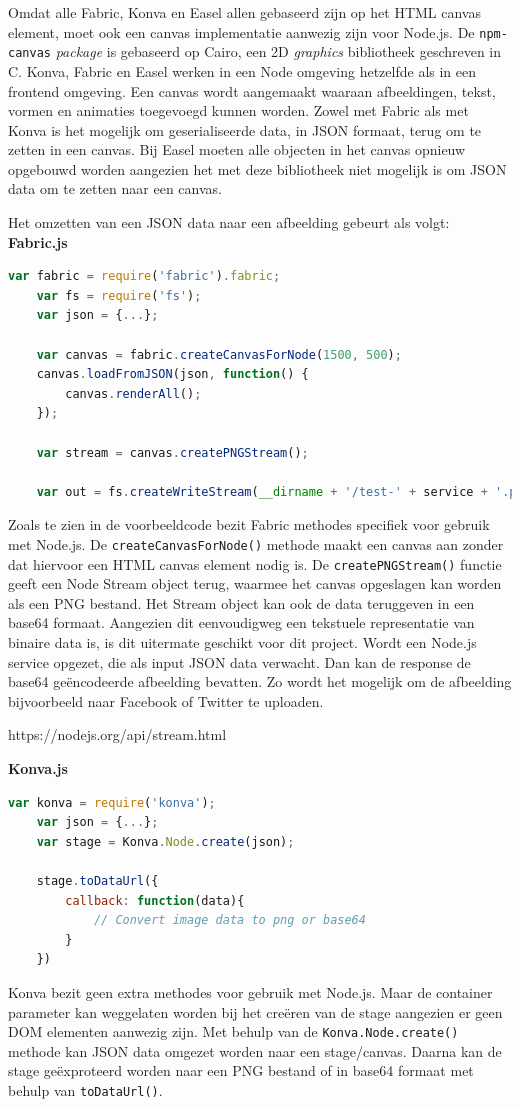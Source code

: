 Omdat alle Fabric, Konva en Easel allen gebaseerd zijn op het HTML canvas element, moet ook een canvas implementatie aanwezig zijn voor Node.js. De \lstinline{npm-canvas} \textit{package} is gebaseerd op Cairo, een 2D \textit{graphics} bibliotheek geschreven in C. %
Konva, Fabric en Easel werken in een Node omgeving hetzelfde als in een frontend omgeving. Een canvas wordt aangemaakt waaraan afbeeldingen, tekst, vormen en animaties toegevoegd kunnen worden. Zowel met Fabric als met Konva is het mogelijk om geserialiseerde data, in JSON formaat, terug om te zetten in een canvas. Bij Easel moeten alle objecten in het canvas opnieuw opgebouwd worden aangezien het met deze bibliotheek niet mogelijk is om JSON data om te zetten naar een canvas. 

Het omzetten van een JSON data naar een afbeelding gebeurt als volgt:
\textbf{Fabric.js}
\begin{lstlisting}[language=javascript]
	var fabric = require('fabric').fabric;
	var fs = require('fs');
	var json = {...};
	
	var canvas = fabric.createCanvasForNode(1500, 500);
	canvas.loadFromJSON(json, function() {
		canvas.renderAll();
	});
	
	var stream = canvas.createPNGStream();
	
	var out = fs.createWriteStream(__dirname + '/test-' + service + '.png');
\end{lstlisting}
Zoals te zien in de voorbeeldcode bezit Fabric methodes specifiek voor gebruik met Node.js. De \lstinline{createCanvasForNode()} methode maakt een canvas aan zonder dat hiervoor een HTML canvas element nodig is. De \lstinline{createPNGStream()} functie geeft een Node Stream object terug, waarmee het canvas opgeslagen kan worden als een PNG bestand. Het Stream object kan ook de data teruggeven in een base64 formaat. Aangezien dit eenvoudigweg een tekstuele representatie van binaire data is, is dit uitermate geschikt voor dit project. Wordt een Node.js service opgezet, die als input JSON data verwacht. Dan kan de response de base64 ge\"{e}ncodeerde afbeelding bevatten. Zo wordt het mogelijk om de afbeelding bijvoorbeeld naar Facebook of Twitter te uploaden. 

https://nodejs.org/api/stream.html

\textbf{Konva.js}
\begin{lstlisting}[language=javascript]
	var konva = require('konva');
	var json = {...};
	var stage = Konva.Node.create(json);
	
	stage.toDataUrl({
		callback: function(data){
			// Convert image data to png or base64 
		}
	})
\end{lstlisting} %
Konva bezit geen extra methodes voor gebruik met Node.js. Maar de container parameter kan weggelaten worden bij het cre\"{e}ren van de stage aangezien er geen DOM elementen aanwezig zijn. Met behulp van de \lstinline{Konva.Node.create()} methode kan JSON data omgezet worden naar een stage/canvas. Daarna kan de stage ge\"{e}xproteerd worden naar een PNG bestand of in base64 formaat met behulp van \lstinline{toDataUrl()}. 

